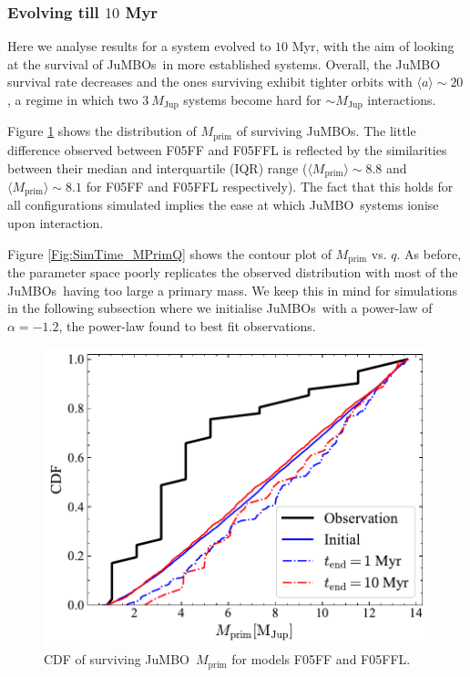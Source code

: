 \documentclass[submission,phys]{lib/SciPost}
\newcommand{\jumbo}{\mbox{JuMBO}}
\newcommand{\jumbos}{\mbox{JuMBOs}}
\begin{document}
    \subsubsection{Evolving till $10$ Myr}
        Here we analyse results for a system evolved to $10$ Myr, with the aim of looking at the survival of \jumbos\, in more established systems. Overall, the \jumbo\, survival rate decreases and the ones surviving exhibit tighter orbits with $\langle a\rangle \sim 20$, a regime in which two $3\ M_{\mathrm{Jup}}$ systems become hard for $\sim M_{\mathrm{Jup}}$ interactions. 
        
        Figure \ref{Fig:Mdistr_SimTime} shows the distribution of $M_{\mathrm{prim}}$ of surviving \jumbos. The little difference  observed between F05FF and F05FFL is reflected by the similarities between their median and interquartile (IQR) range ($\langle M_{\mathrm{prim}}\rangle\sim 8.8$ and $\langle M_{\mathrm{prim}}\rangle \sim 8.1$ for F05FF and F05FFL respectively). The fact that this holds for all configurations simulated implies the ease at which \jumbo\, systems ionise upon interaction.

        Figure \ref{Fig:SimTime_MPrimQ} shows the contour plot of $M_{\mathrm{prim}}$ vs. $q$. As before, the parameter space poorly replicates the observed distribution with most of the \jumbos\, having too large a primary mass. We keep this in mind for simulations in the following subsection where we initialise \jumbos\, with a power-law of $\alpha = -1.2$, the power-law found to best fit observations.
   
   \begin{figure}
    \centering
        \includegraphics[width=\columnwidth]{figures/SimTime_mprim_vs_obs_.pdf}
        \caption{CDF of surviving \jumbo\, $M_{\mathrm{prim}}$ for models F05FF and F05FFL.}
         \label{Fig:Mdistr_SimTime}
   \end{figure}
   
\end{document}
